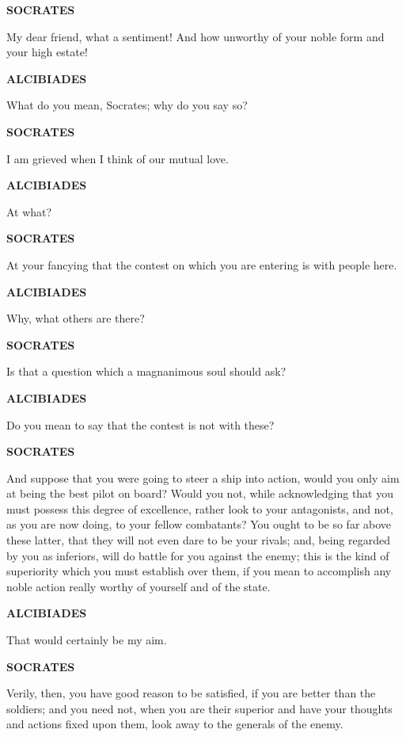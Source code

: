 \documentclass[11pt,letter]{article}
\begin{document}
\par \textbf{SOCRATES}
\par   My dear friend, what a sentiment! And how unworthy of your noble form and your high estate!

\par \textbf{ALCIBIADES}
\par   What do you mean, Socrates; why do you say so?

\par \textbf{SOCRATES}
\par   I am grieved when I think of our mutual love.

\par \textbf{ALCIBIADES}
\par   At what?

\par \textbf{SOCRATES}
\par   At your fancying that the contest on which you are entering is with people here.

\par \textbf{ALCIBIADES}
\par   Why, what others are there?

\par \textbf{SOCRATES}
\par   Is that a question which a magnanimous soul should ask?

\par \textbf{ALCIBIADES}
\par   Do you mean to say that the contest is not with these?

\par \textbf{SOCRATES}
\par   And suppose that you were going to steer a ship into action, would you only aim at being the best pilot on board? Would you not, while acknowledging that you must possess this degree of excellence, rather look to your antagonists, and not, as you are now doing, to your fellow combatants? You ought to be so far above these latter, that they will not even dare to be your rivals; and, being regarded by you as inferiors, will do battle for you against the enemy; this is the kind of superiority which you must establish over them, if you mean to accomplish any noble action really worthy of yourself and of the state.

\par \textbf{ALCIBIADES}
\par   That would certainly be my aim.

\par \textbf{SOCRATES}
\par   Verily, then, you have good reason to be satisfied, if you are better than the soldiers; and you need not, when you are their superior and have your thoughts and actions fixed upon them, look away to the generals of the enemy.
\end{document}
